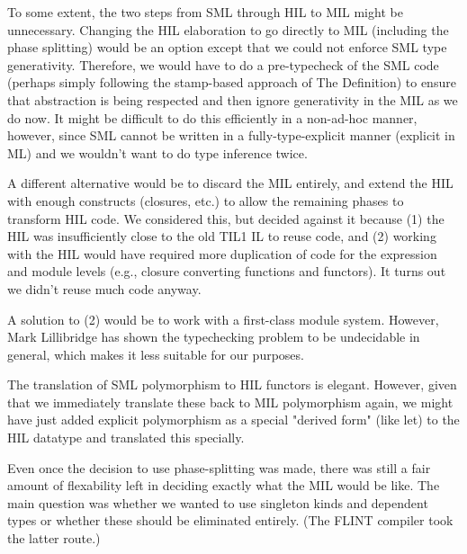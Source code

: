 \documentclass[twoside]{article}
\begin{document}
To some extent, the two steps from SML through HIL to MIL might be
unnecessary.  Changing the HIL elaboration to go directly to MIL
(including the phase splitting) would be an option except that we
could not enforce SML type generativity.  Therefore, we would have to
do a pre-typecheck of the SML code (perhaps simply following the
stamp-based approach of The Definition) to ensure that abstraction is
being respected and then ignore generativity in the MIL as we do now.
It might be difficult to do this efficiently in a non-ad-hoc
manner, however, since SML cannot be written in a fully-type-explicit
manner (explicit in ML) and we wouldn't want to do type inference twice.

A different alternative would be to discard the MIL entirely, and
extend the HIL with enough constructs (closures, etc.) to allow the
remaining phases to transform HIL code.  We considered this, but
decided against it because (1) the HIL was insufficiently close to the
old TIL1 IL to reuse code, and (2) working with the HIL would have
required more duplication of code for the expression and module levels
(e.g., closure converting functions and functors).  It turns out 
we didn't reuse much code anyway.

A solution to (2) would be to work with a first-class module
system.  However, Mark Lillibridge has shown the typechecking
problem to be undecidable in general, which makes it less suitable
for our purposes.

The translation of SML polymorphism to HIL functors is elegant.
However, given that we immediately translate these back to MIL
polymorphism again, we might have just added explicit polymorphism as
a special "derived form" (like let) to the HIL datatype and translated
this specially.

Even once the decision to use phase-splitting was made, there
was still a fair amount of flexability left in deciding exactly
what the MIL would be like.  The main question was whether
we wanted to use singleton kinds and dependent types or
whether these should be eliminated entirely. (The FLINT compiler
took the latter route.)  
\end{document}
